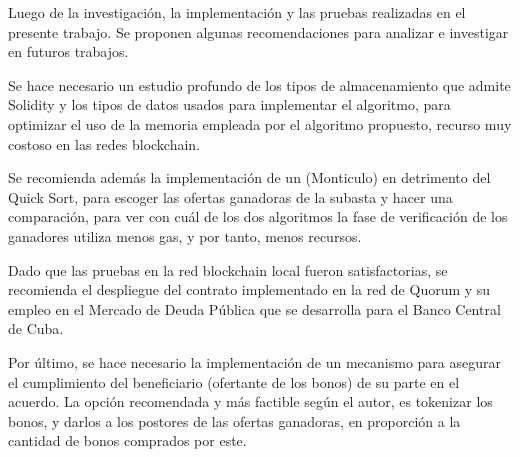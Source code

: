 \begin{recomendations}
    Luego de la investigación, la implementación y las pruebas realizadas en el presente trabajo. Se 
    proponen algunas recomendaciones para analizar e investigar en futuros trabajos.

    Se hace necesario un estudio profundo de los tipos de almacenamiento que admite Solidity y los tipos de
    datos usados para implementar el algoritmo, para optimizar el uso de la memoria empleada por el algoritmo
    propuesto, recurso muy costoso en las redes blockchain.

    Se recomienda además la implementación de un  (Monticulo) en detrimento del Quick Sort,
    para escoger las ofertas ganadoras de la subasta y hacer una comparación, para ver con cuál de los
    dos algoritmos la fase de verificación de los ganadores utiliza menos gas, y por tanto, menos recursos.

    Dado que las pruebas en la red blockchain local fueron satisfactorias, se recomienda el despliegue del
    contrato implementado en la red de Quorum y su empleo en el Mercado de Deuda Pública que se desarrolla para el Banco Central de Cuba.

    Por último, se hace necesario la implementación de un mecanismo para asegurar el cumplimiento del
    beneficiario (ofertante de los bonos) de su parte en el acuerdo. La opción recomendada y más 
    factible según el autor, es tokenizar los bonos, y darlos a los postores de las ofertas ganadoras,
    en proporción a la cantidad de bonos comprados por este.

\end{recomendations}
